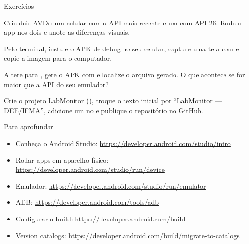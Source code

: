 \documentclass[aspectratio=169,10pt]{beamer}
\begin{document}
\begin{frame}{Exercícios}
  \begin{exercicio}
    Crie dois AVDs: um celular com a API mais recente e um com API 26. Rode o app nos dois e anote as diferenças visuais.
  \end{exercicio}
  \begin{exercicio}
    Pelo terminal, instale o APK de debug no seu celular, capture uma tela com  e copie a imagem para o computador.
  \end{exercicio}
  \begin{exercicio}
    Altere  para , gere o APK com  e localize o arquivo gerado. O que acontece se  for maior que a API do seu emulador?
  \end{exercicio}
  \begin{projeto}
    Crie o projeto LabMonitor (), troque o texto inicial por ``LabMonitor --- DEE/IFMA'', adicione um  no  e publique o repositório no GitHub.
  \end{projeto}
\end{frame}

\begin{frame}{Para aprofundar}
  \small
  \begin{itemize}
    \item Conheça o Android Studio: \url{https://developer.android.com/studio/intro}
    \item Rodar apps em aparelho físico: \url{https://developer.android.com/studio/run/device}
    \item Emulador: \url{https://developer.android.com/studio/run/emulator}
    \item ADB: \url{https://developer.android.com/tools/adb}
    \item Configurar o build: \url{https://developer.android.com/build}
    \item Version catalogs: \url{https://developer.android.com/build/migrate-to-catalogs}
  \end{itemize}
\end{frame}
\end{document}
